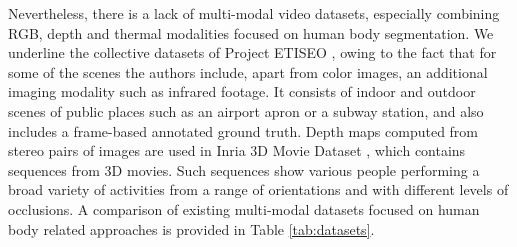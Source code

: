\documentclass[10pt,twocolumn,letterpaper]{article}
\begin{document}
Nevertheless, there is a lack of multi-modal video datasets, especially combining RGB, depth and thermal modalities focused on human body segmentation. We underline the collective datasets of Project ETISEO \cite{nghiem2007etiseo}, owing to the fact that for some of the scenes the authors include, apart from color images, an additional imaging modality such as infrared footage. It consists of indoor and outdoor scenes of public places such as an airport apron or a subway station, and also includes a frame-based annotated ground truth. Depth maps computed from stereo pairs of images are used in Inria 3D Movie Dataset \cite{alahari2013pose}, which contains sequences from 3D movies. Such sequences show various people performing a broad variety of activities from a range of orientations and with different levels of occlusions. A comparison of existing multi-modal datasets focused on human body related approaches is provided in Table \ref{tab:datasets}.
\end{document}
